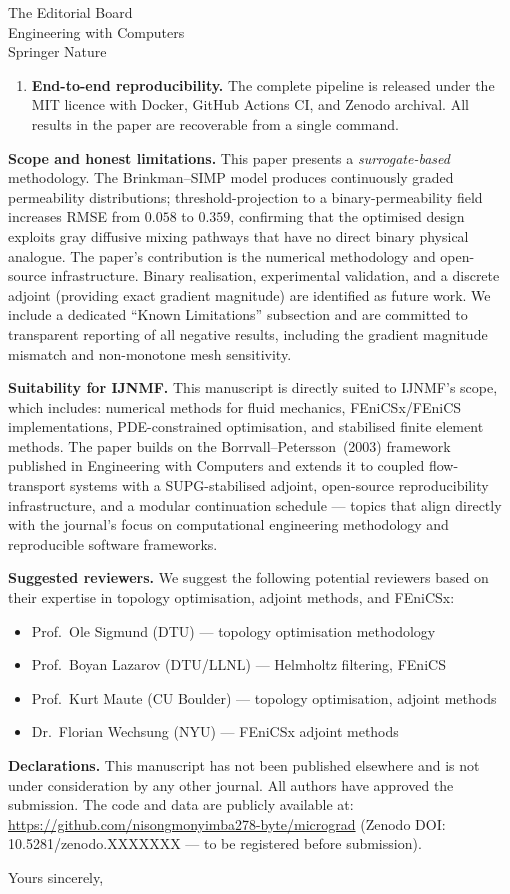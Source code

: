 \documentclass[12pt,a4paper]{letter}
\begin{document}
\begin{letter}{
    The Editorial Board\\
    Engineering with Computers\\
    Springer Nature
}
\begin{enumerate}
\item \textbf{End-to-end reproducibility.}
The complete pipeline is released under the MIT licence with Docker,
GitHub Actions CI, and Zenodo archival.
All results in the paper are recoverable from a single command.
\end{enumerate}

\textbf{Scope and honest limitations.}
This paper presents a \emph{surrogate-based} methodology.
The Brinkman--SIMP model produces continuously graded permeability
distributions; threshold-projection to a binary-permeability field
increases RMSE from $0.058$ to $0.359$, confirming that the optimised
design exploits gray diffusive mixing pathways that have no direct
binary physical analogue.
The paper's contribution is the numerical methodology and open-source
infrastructure.
Binary realisation, experimental validation, and a discrete adjoint
(providing exact gradient magnitude) are identified as future work.
We include a dedicated ``Known Limitations'' subsection and are committed
to transparent reporting of all negative results, including the
gradient magnitude mismatch and non-monotone mesh sensitivity.

\textbf{Suitability for IJNMF.}
This manuscript is directly suited to IJNMF's scope, which includes:
numerical methods for fluid mechanics, FEniCSx/FEniCS implementations,
PDE-constrained optimisation, and stabilised finite element methods.
The paper builds on the Borrvall--Petersson~(2003) framework published in
Engineering with Computers and extends it to coupled flow-transport
systems with a SUPG-stabilised adjoint, open-source
reproducibility infrastructure, and a modular continuation schedule ---
topics that align directly with the journal's focus on computational
engineering methodology and reproducible software frameworks.

\textbf{Suggested reviewers.}
We suggest the following potential reviewers based on their expertise
in topology optimisation, adjoint methods, and FEniCSx:
\begin{itemize}
\item Prof.\ Ole Sigmund (DTU) --- topology optimisation methodology
\item Prof.\ Boyan Lazarov (DTU/LLNL) --- Helmholtz filtering, FEniCS
\item Prof.\ Kurt Maute (CU Boulder) --- topology optimisation, adjoint methods
\item Dr.\ Florian Wechsung (NYU) --- FEniCSx adjoint methods
\end{itemize}

\textbf{Declarations.}
This manuscript has not been published elsewhere and is not under
consideration by any other journal.
All authors have approved the submission.
The code and data are publicly available at:
\url{https://github.com/nisongmonyimba278-byte/micrograd}
(Zenodo DOI: 10.5281/zenodo.XXXXXXX --- to be registered before submission).

\closing{Yours sincerely,}

\end{letter}
\end{document}
